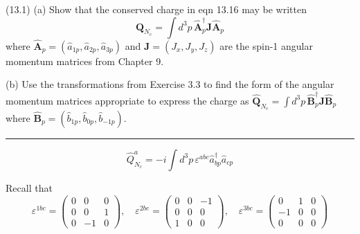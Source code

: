 \documentclass[12pt]{article}
\begin{document}
(13.1)
(a) Show that the conserved charge in eqn 13.16
may be written
\begin{equation*}
\hat{\mathbf Q}_{N_c}=\int d^3p\,\hat{\mathbf A}_p^\dag
\mathbf J\hat{\mathbf A}_p
\tag{13.41}
\end{equation*}
where $\hat{\mathbf A}_p=(\hat a_{1p},\hat a_{2p},\hat a_{3p})$
and $\mathbf J=(J_x,J_y,J_z)$ are the spin-1 angular momentum
matrices from Chapter 9.

\bigskip
(b) Use the transformations from Exercise 3.3 to
find the form of the angular momentum matrices
appropriate to express the charge as
$\hat{\mathbf Q}_{N_c}=\int d^3p\,
\hat{\mathbf B}_p^\dag\mathbf J\hat{\mathbf B}_p$
where $\hat{\mathbf B}_p=(\hat b_{1p},\hat b_{0p},\hat b_{-1p})$.

\bigskip
\hrule

\bigskip
\begin{equation*}
\hat Q_{N_c}^a=-i\int d^3p\,\varepsilon^{abc}\hat a_{bp}^\dag\hat a_{cp}
\tag{13.16}
\end{equation*}

Recall that
\begin{equation*}
\varepsilon^{1bc}=\begin{pmatrix}
0&0&0
\\
0&0&1
\\
0&-1&0
\end{pmatrix},
\quad
\varepsilon^{2bc}=\begin{pmatrix}
0&0&-1
\\
0&0&0
\\
1&0&0
\end{pmatrix},
\quad
\varepsilon^{3bc}=\begin{pmatrix}
0&1&0
\\
-1&0&0
\\
0&0&0
\end{pmatrix}
\end{equation*}
\end{document}
